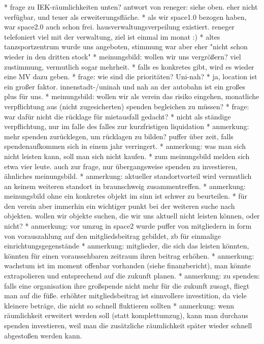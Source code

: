 \documentclass{s0minutes}
\begin{document}
			* frage zu IEK-räumlichkeiten unten? antwort von reneger: siehe oben. eher nicht verfügbar, und teuer als erweiterungsfläche.
			* als wir space1.0 bezogen haben, war space2.0 auch schon frei. hausverwaltungsverpeilung existiert. reneger telefoniert viel mit der verwaltung, ziel ist einmal im monat :)
				* altes tanzsportzentrum wurde uns angeboten, stimmung war aber eher "nicht schon wieder in den dritten stock"
		* meinungsbild: wollen wir uns vergrößern? viel zustimmung, vermutlich sogar mehrheit.
		* falls es konkretes gibt, wird es wieder eine MV dazu geben.
		* frage: wie sind die prioritäten? Uni-nah? 
			* ja, location ist ein großer faktor. innenstadt-/uninah und nah an der autobahn ist ein großes plus für uns.
		* meinungsbild: wollen wir als verein das risiko eingehen, monatliche verpflichtung aus (nicht zugesicherten) spenden begleichen zu müssen?
			* frage: war dafür nicht die rücklage für mietausfall gedacht?
				* nicht als ständige verpflichtung, nur im falle des falles zur kurzfristigen liquidation
				* anmerkung: mehr spenden zurücklegen, um rücklagen zu bilden? puffer über zeit, falls spendenaufkommen sich in einem jahr verringert.
			* anmerkung: was man sich nicht leisten kann, soll man sich nicht kaufen.
			* zum meinungsbild melden sich etwa vier leute. auch zur frage, nur übergangsweise spenden zu investieren, ähnliches meinungsbild.
		* anmerkung: aktueller standortvorteil wird vermutlich an keinem weiteren standort in braunschweig zusammentreffen.
		* anmerkung: meinungsbild ohne ein konkretes objekt im sinn ist schwer zu beurteilen.
			* für den verein aber immerhin ein wichtiger punkt bei der weiteren suche nach objekten. wollen wir objekte suchen, die wir uns aktuell nicht leisten können, oder nicht?
		* anmerkung: vor umzug in space2 wurde puffer von mitgliedern in form von vorauszahlung auf den mitgliedsbeitrag gebildet, zb für einmalige einrichtungsgegenstände
		* anmerkung: mitglieder, die sich das leisten könnten, könnten für einen voraussehbaren zeitraum ihren beitrag erhöhen.
		* anmerkung: wachstum ist im moment offenbar vorhanden (siehe finanzbericht), man könnte extrapolieren und entsprechend auf die zukunft planen.
		* anmerkung: zu spenden: falls eine organisation ihre großspende nicht mehr für die zukunft zusagt, fliegt man auf die füße. erhöhter mitgliedsbeitrag ist sinnvollere investition, da viele kleinere beträge, die nicht so schnell fluktieren sollten
		* anmerkung: wenn räumlichkeit erweitert werden soll (statt komplettumzug), kann man durchaus spenden investieren, weil man die zusätzliche räumlichkeit später wieder schnell abgestoßen werden kann.
\end{document}
